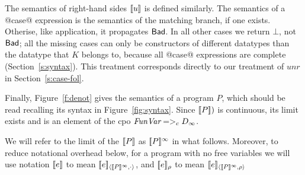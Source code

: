 The semantics of right-hand sides $[\![u]\!]$ is defined similarly.  The
semantics of a @case@ expression is the semantics of the matching branch,
if one exists. Otherise, like application, it propagates $\mathsf{Bad}$.
In all other cases we return $\bot$, not $\mathsf{Bad}$;
all the missing cases can only be constructors
of different datatypes than the datatype that $K$ belongs to, because
all @case@ expressions are complete (Section~\ref{s:syntax}).
This treatment corresponds directly to our treatment of $unr$ in Section~\ref{s:case-fol}.

Finally, Figure~\ref{f:denot} gives the semantics of a program $P$, which should
be read recalling its syntax in Figure~\ref{fig:syntax}.
Since $[\![P]\!])$ is continuous, its limit exists and is an element of the
cpo $\textit{FunVar} =>_c D_{\infty}$.

\begin{definition}
We will refer to the limit of the $[\![P]\!]$ as $[\![P]\!]^{\infty}$ in what follows.
Moreover, to reduce notational overhead below, for a program with no free variables we
will use notation $[\![e]\!]$ to mean $[\![e]\!]_{\langle {[\![P]\!]^\infty},{\cdot}\rangle}$, and
$[\![e]\!]_\rho$ to mean $[\![e]\!]_{\langle {[\![P]\!]^\infty},{\rho}\rangle}$
\end{definition}


